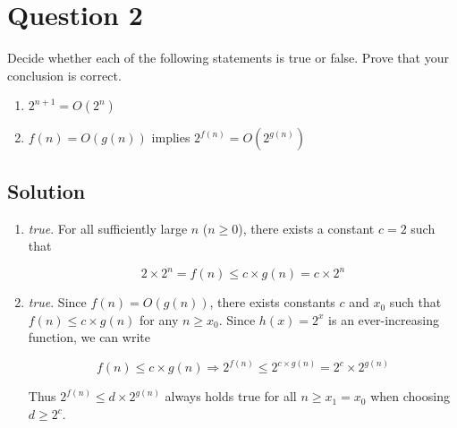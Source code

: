 
\section*{Question 2}

Decide whether each of the following statements is true or false.
Prove that your conclusion is correct.
\begin{enumerate}[label=(\alph*)]
\item $2^{n+1} = O(2^n)$
\item $f(n) = O(g(n))$ implies $2^{f(n)} = O(2^{g(n)})$
\end{enumerate}

\subsection*{Solution}
\begin{enumerate}[label=(\alph*)]
\item \textit{true}.
For all sufficiently large $n$ ($n \geq 0$), there exists a constant $c = 2$ such that

\begin{equation}
2 \times 2^n = f(n) \leq c \times g(n) = c \times 2^n
\end{equation}

\item \textit{true}.
Since $f(n) = O(g(n))$, there exists constants $c$ and $x_0$ such that $f(n) \leq c \times g(n)$ for any $n \geq x_0$.
Since $h(x) = 2^x$ is an ever-increasing function, we can write

\begin{equation}
f(n) \leq c \times g(n) \Rightarrow 2^{f(n)} \leq 2^{c \times g(n)} = 2^c \times 2^{g(n)}
\end{equation}

Thus $2^{f(n)} \leq d \times 2^{g(n)}$ always holds true for all $n \geq x_1 = x_0$ when choosing $d \geq 2^c$.

\end{enumerate}
